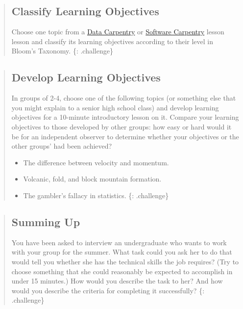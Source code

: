 \begin{quote}
\subsection{Classify Learning
Objectives}\label{classify-learning-objectives}

Choose one topic from a
\href{\{\{\%20site.dc\_site\%20\}\}/lessons/}{Data Carpentry} or
\href{\{\{\%20site.swc\_site\%20\}\}/lessons/}{Software Carpentry} lesson
lesson and classify its learning objectives according to their level in
Bloom's Taxonomy. \{: .challenge\}
\end{quote}

\begin{quote}
\subsection{Develop Learning
Objectives}\label{develop-learning-objectives}

In groups of 2-4, choose one of the following topics (or something else
that you might explain to a senior high school class) and develop
learning objectives for a 10-minute introductory lesson on it. Compare
your learning objectives to those developed by other groups: how easy or
hard would it be for an independent observer to determine whether your
objectives or the other groups' had been achieved?

\begin{itemize}
\itemsep1pt\parskip0pt
\item
  The difference between velocity and momentum.
\item
  Volcanic, fold, and block mountain formation.
\item
  The gambler's fallacy in statistics. \{: .challenge\}
\end{itemize}
\end{quote}

\begin{quote}
\subsection{Summing Up}\label{summing-up}

You have been asked to interview an undergraduate who wants to work with
your group for the summer. What task could you ask her to do that would
tell you whether she has the technical skills the job requires? (Try to
choose something that she could reasonably be expected to accomplish in
under 15 minutes.) How would you describe the task to her? And how would
you describe the criteria for completing it successfully? \{:
.challenge\}
\end{quote}

